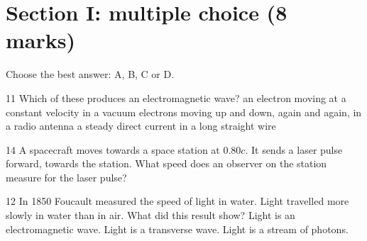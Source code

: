 \section*{Section I: multiple choice (8 marks)}
Choose the best answer: A, B, C or D.

\begin{practiceq}{1}{1}\label{pq:produce}
Which of these produces an electromagnetic wave?
  {an electron moving at a constant velocity in a vacuum}
  {electrons moving up and down, again and again, in a radio antenna}
  {a steady direct current in a long straight wire}
\end{practiceq}

\begin{practiceq}{1}{4}\label{pq:laser}
A spacecraft moves towards a space station at $0.80c$. It sends a laser pulse forward, towards
the station. What speed does an observer on the station measure for the laser pulse?
\end{practiceq}

\begin{practiceq}{1}{2}\label{pq:foucault}
In 1850 Foucault measured the speed of light in water. Light travelled more slowly in water
than in air. What did this result show?
  {Light is an electromagnetic wave.}
  {Light is a transverse wave.}
  {Light is a stream of photons.}
\end{practiceq}

